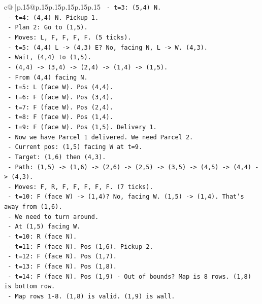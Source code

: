 \documentclass{article}
\begin{document}
{\begin{supertabular}{c@{$\;$}|p{.15\linewidth}@{}p{.15\linewidth}p{.15\linewidth}p{.15\linewidth}p{.15\linewidth}p{.15\linewidth}}
{{{\texttt{    {-} t=3: (5,4) N.} \\
\texttt{    {-} t=4: (4,4) N. Pickup 1.} \\
\texttt{  {-} Plan 2: Go to (1,5).} \\
\texttt{    {-} Moves: L, F, F, F, F. (5 ticks).} \\
\texttt{    {-} t=5: (4,4) L {-}> (4,3) E? No, facing N, L {-}> W. (4,3).} \\
\texttt{    {-} Wait, (4,4) to (1,5).} \\
\texttt{    {-} (4,4) {-}> (3,4) {-}> (2,4) {-}> (1,4) {-}> (1,5).} \\
\texttt{    {-} From (4,4) facing N.} \\
\texttt{    {-} t=5: L (face W). Pos (4,4).} \\
\texttt{    {-} t=6: F (face W). Pos (3,4).} \\
\texttt{    {-} t=7: F (face W). Pos (2,4).} \\
\texttt{    {-} t=8: F (face W). Pos (1,4).} \\
\texttt{    {-} t=9: F (face W). Pos (1,5). Delivery 1.} \\
\texttt{  {-} Now we have Parcel 1 delivered. We need Parcel 2.} \\
\texttt{  {-} Current pos: (1,5) facing W at t=9.} \\
\texttt{  {-} Target: (1,6) then (4,3).} \\
\texttt{  {-} Path: (1,5) {-}> (1,6) {-}> (2,6) {-}> (2,5) {-}> (3,5) {-}> (4,5) {-}> (4,4) {-}> (4,3).} \\
\texttt{  {-} Moves: F, R, F, F, F, F, F. (7 ticks).} \\
\texttt{  {-} t=10: F (face W) {-}> (1,4)? No, facing W. (1,5) {-}> (1,4). That's away from (1,6).} \\
\texttt{  {-} We need to turn around.} \\
\texttt{  {-} At (1,5) facing W.} \\
\texttt{  {-} t=10: R (face N).} \\
\texttt{  {-} t=11: F (face N). Pos (1,6). Pickup 2.} \\
\texttt{  {-} t=12: F (face N). Pos (1,7).} \\
\texttt{  {-} t=13: F (face N). Pos (1,8).} \\
\texttt{  {-} t=14: F (face N). Pos (1,9) {-} Out of bounds? Map is 8 rows. (1,8) is bottom row.} \\
\texttt{  {-} Map rows 1{-}8. (1,8) is valid. (1,9) is wall.} \\
}}}
\end{supertabular}}
\end{document}
